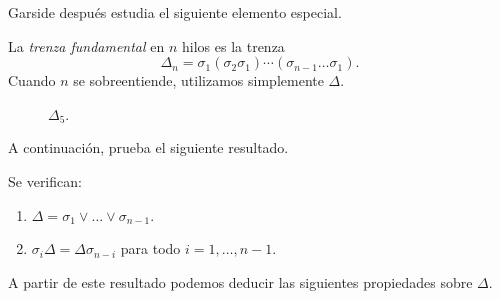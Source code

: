 \documentclass[TFG.tex]{subfiles}
\begin{document}
Garside después estudia el siguiente elemento especial.
\begin{defi}
La \emph{trenza fundamental} en $n$ hilos es la trenza
$$\Delta_n=\sigma_1(\sigma_2\sigma_1)\cdots(\sigma_{n-1}\dots\sigma_1).$$
Cuando $n$ se sobreentiende, utilizamos simplemente $\Delta$. 
\begin{figure}[h!]
\centering
{}
\caption{$\Delta_5$.}
\end{figure}

\end{defi} 
A continuación, prueba el siguiente resultado.
\begin{prop}\label{conjuga}
Se verifican: 
\begin{enumerate}
\item $\Delta=\sigma_1\lor\dots\lor\sigma_{n-1}$.
\item $\sigma_i\Delta=\Delta\sigma_{n-i}$ para todo $i=1,\dots, n-1$.
\end{enumerate}
\end{prop} 

A partir de este resultado podemos deducir las siguientes propiedades sobre $\Delta$.
\end{document}
